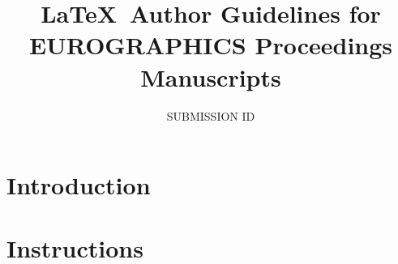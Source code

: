 

\title[EG \LaTeX\ Author Guidelines]%
      {\LaTeX\ Author Guidelines for EUROGRAPHICS Proceedings Manuscripts}

\author[]{SUBMISSION ID}


%





\maketitle

\begin{abstract}


\begin{classification} %
\end{classification}

\end{abstract}

\section{Introduction}

\section{Instructions}

